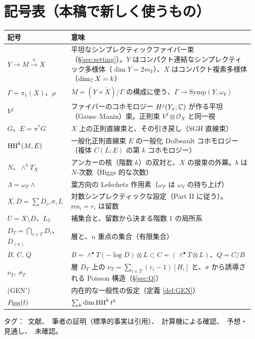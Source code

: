 \section{記号表（本稿で新しく使うもの）}\label{sec:notation}
\begin{longtable}{>{\raggedright\arraybackslash}p{3.8cm}>{\raggedright\arraybackslash}p{11.2cm}}
\toprule 記号 & 意味\\ \midrule\endhead
$Y\to M\xrightarrow{\pi} X$ & 平坦なシンプレクティックファイバー束（\S\ref{sec:setting}）。$Y$ はコンパクト連結なシンプレクティック多様体（$\dim Y=2m_Y$）、$X$ はコンパクト複素多様体（$\dim_\mathbb C X=k$）\\
$\Gamma=\pi_1(X)$、$\rho$ & $M=(Y\times\tilde X)/\Gamma$ の構成に使う、$\Gamma\to\mathrm{Symp}(Y,\omega_Y)$\\
$V^j$ & ファイバーのコホモロジー $H^j(Y_x;\mathbb C)$ が作る平坦（Gauss--Manin）束。正則束 $V^j\otimes\mathcal O_X$ と同一視\\
$G$、$E=\pi^*G$ & $X$ 上の正則直線束と、その引き戻し（SGH 直線束）\\
$\mathrm{HH}^k(M,E)$ & 一般化正則直線束 $E$ の一般化 Dolbeault コホモロジー（複体 $C(L;E)$ の第 $k$ コホモロジー）\\
$N$、$\wedge^bT_X$ & アンカーの核（階数 $k$）の双対と、$X$ の接束の外冪。$b$ は $N$-次数（Higgs 的な次数）\\
$\Lambda=\omega_F\wedge$ & 葉方向の Lefschetz 作用素（$\omega_F$ は $\omega_Y$ の持ち上げ）\\
$X,D=\sum D_i,\sigma,L$ & 対数シンプレクティックな設定（Part II に従う）。$\mathrm{res}_i=r_i$ は留数\\
$U=X\setminus D$、$L_U$ & 補集合と、留数から決まる階数 1 の局所系\\
$D_T=\bigcap_{i\in T}D_i$、$D_{(n)}$ & 層と、$n$ 重点の集合（有限集合）\\
$B,\,C,\,Q$ & $B=\wedge^\bullet T(-\log D)\otimes L\subset C=(\wedge^\bullet T\otimes L)$、$Q=C/B$\\
$\nu_T,\ \sigma_T$ & 層 $D_T$ 上の $\nu_T=\sum_{i\in T}(r_i-1)[H_i]$ と、$\sigma$ から誘導される Poisson 構造（\S\ref{sec:Q}）\\
(GEN$'$) & 内在的な一般性の仮定（定義 \ref{def:GEN}）\\
$P_{\mathrm{HH}}(t)$ & $\sum_k\dim\mathrm{HH}^k\,t^k$\\
\bottomrule
\end{longtable}
\noindent タグ：\tC\ 文献、\tP\ 筆者の証明（標準的事実は引用）、\tV\ 計算機による確認、\tK\ 予想・見通し、\tQ\ 未確認。

